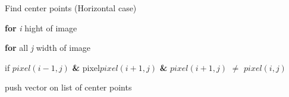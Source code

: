 \documentclass[../Head/Main.tex]{subfiles}
\begin{document}
\begin{Pseudo}{Find center points (Horizontal case)}{}

 	\textbf{for} \textit{i} hight of image 
	\begin{Indentation}
		\item 
	\begin{Indentation}
	\item \textbf{for} all \textit{j} width of image 
	\item if $pixel(i-1,j)$ \textbf{\&} pixel$pixel(i+1,j)$ \textbf{\&} $pixel(i+1,j)$ $\neq$ $pixel(i,j)$ 
	\item push vector on list of center points
	\end{Indentation}
	
	
	\end{Indentation}
	
\end{Pseudo}
\end{document}
